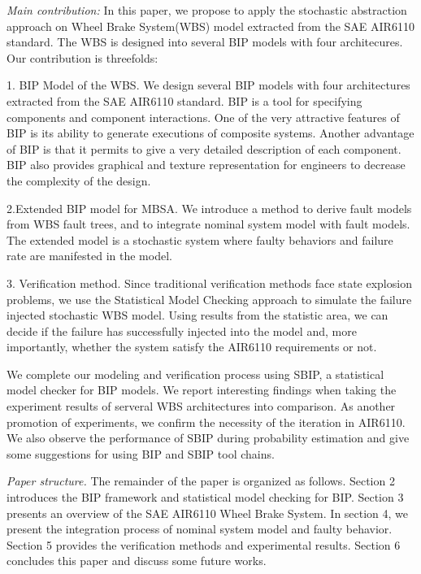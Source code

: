 \emph{Main contribution:} 
In this paper, we propose to apply the stochastic abstraction approach on Wheel Brake System(WBS) model extracted from the SAE AIR6110 standard. The WBS is designed into several BIP models with four architecures. Our contribution is threefolds:

1. BIP Model of the WBS. We design several BIP models with four architectures extracted from the SAE AIR6110 standard. BIP is a tool for specifying components and component interactions. One of the very attractive features of BIP is its ability to generate executions of composite systems. Another advantage of BIP is that it permits to give a very detailed description of each component. BIP also provides graphical and texture representation for engineers to decrease the complexity of the design.

2.Extended BIP model for MBSA. We introduce a method to derive fault models from WBS fault trees, and to integrate nominal system model with fault models. The extended model is a stochastic system where faulty behaviors and failure rate are manifested in the model.
 
3. Verification method. Since traditional verification methods face state explosion problems, we use the Statistical Model Checking\cite{vmcai04}\cite{cav04}\cite{cmu04} approach to simulate the failure injected stochastic WBS model. Using results from the statistic area, we can decide if the failure has successfully injected into the model and, more importantly, whether the system satisfy the AIR6110 requirements or not.

We complete our modeling and verification process using SBIP\cite{sbip18}, a statistical model checker for BIP models.
We report interesting findings when taking the experiment results of serveral WBS architectures into comparison. As another promotion of experiments, we confirm the necessity of the iteration in AIR6110. We also observe the performance of SBIP during probability estimation and give some suggestions for using BIP and SBIP tool chains.

\emph{Paper structure.}
The remainder of the paper is organized as follows. Section 2 introduces the BIP framework and statistical model checking for BIP. 
Section 3 presents an overview of the SAE AIR6110 Wheel Brake System. 
In section 4, we present the integration process of nominal system model and faulty behavior. 
Section 5 provides the verification methods and experimental results. 
Section 6 concludes this paper and discuss some future works.
